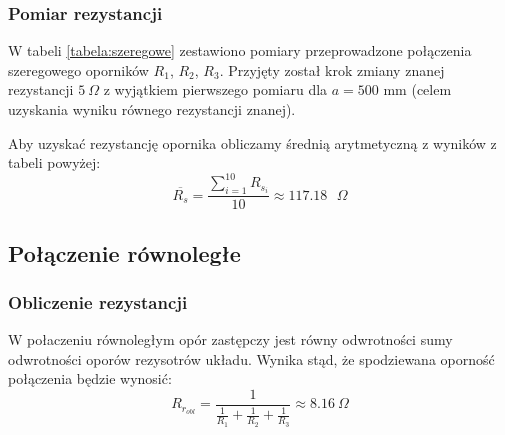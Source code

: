 \documentclass[a4paper,12pts]{article}
\begin{document}
	\subsubsection{Pomiar rezystancji}
	W tabeli \ref{tabela:szeregowe} zestawiono pomiary przeprowadzone połączenia szeregowego oporników $R_1$, $R_2$, $R_3$. Przyjęty został krok zmiany znanej rezystancji $5 ~\Omega$ z wyjątkiem pierwszego pomiaru dla $a = 500$ mm (celem uzyskania wyniku równego rezystancji znanej).
	
	\begin{table}[!h]
		\centering
		\caption{Wyniki pomiarów dla połączenia szeregowego}
		\label{tabela:szeregowe}
	\end{table}
	
	Aby uzyskać rezystancję opornika obliczamy średnią arytmetyczną z wyników z tabeli powyżej:
	\begin{equation}
	\overline{R_{s}} = \frac{\sum_{i = 1}^{10} R_{{s}_i}}{10} \approx 117.18 \textrm{ $\Omega$}
	\end{equation}
	
	
	\subsection{Połączenie równoległe}
	\subsubsection{Obliczenie rezystancji}
	W połaczeniu równoległym opór zastępczy jest równy odwrotności sumy odwrotności oporów rezysotrów układu. Wynika stąd, że spodziewana oporność połączenia będzie wynosić:
	\begin{equation}
		R_{r_{obl}} = \frac{1}{\frac{1}{R_1} + \frac{1}{R_2} + \frac{1}{R_3}} \approx 8.16~\Omega 
	\end{equation}
	
\end{document}
